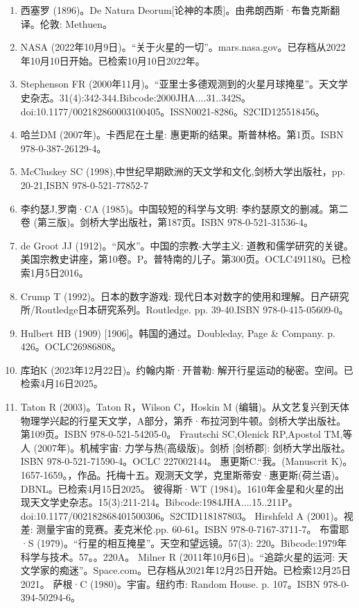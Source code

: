 \begin{enumerate}
\item 西塞罗 (1896)。De Natura Deorum[论神的本质]。由弗朗西斯·布鲁克斯翻译。伦敦: Methuen。
\item NASA (2022年10月9日)。“关于火星的一切”。mars.nasa.gov。已存档从2022年10月10日开始。已检索10月10日2022年。
\item Stephenson FR (2000年11月)。“亚里士多德观测到的火星月球掩星”。天文学史杂志。31(4):342-344.Bibcode:2000JHA....31..342S。doi:10.1177/002182860003100405。ISSN0021-8286。S2CID125518456。  
\item 哈兰DM (2007年)。卡西尼在土星: 惠更斯的结果。斯普林格。第1页。ISBN 978-0-387-26129-4。
\item McCluskey SC (1998),中世纪早期欧洲的天文学和文化,剑桥大学出版社，pp. 20-21,ISBN 978-0-521-77852-7
\item 李约瑟J,罗南·CA (1985)。中国较短的科学与文明: 李约瑟原文的删减。第二卷 (第三版)。剑桥大学出版社，第187页。ISBN 978-0-521-31536-4。
\item de Groot JJ (1912)。“风水”。中国的宗教-大学主义: 道教和儒学研究的关键。美国宗教史讲座，第10卷。P。普特南的儿子。第300页。OCLC491180。已检索1月5日2016。 
\item Crump T (1992)。日本的数字游戏: 现代日本对数字的使用和理解。日产研究所/Routledge日本研究系列。Routledge. pp. 39-40.ISBN 978-0-415-05609-0。
\item Hulbert HB (1909) [1906]。韩国的通过。Doubleday, Page & Company. p. 426。OCLC26986808。 
\item 库珀K (2023年12月22日)。约翰内斯·开普勒: 解开行星运动的秘密。空间。已检索4月16日2025。
\item Taton R (2003)。Taton R，Wilson C，Hoskin M (编辑)。从文艺复兴到天体物理学兴起的行星天文学，A部分，第乔·布拉河到牛顿。剑桥大学出版社。第109页。ISBN 978-0-521-54205-0。
 Frautschi SC,Olenick RP,Apostol TM,等人 (2007年)。机械宇宙: 力学与热(高级版)。剑桥 [剑桥郡]: 剑桥大学出版社。ISBN 978-0-521-71590-4。OCLC 227002144。
 惠更斯C.“我。(Manuscrit K)。1657-1659。，作品。托梅十五。观测天文学，克里斯蒂安·惠更斯(荷兰语)。DBNL。已检索4月15日2025。
 彼得斯·WT (1984)。1610年金星和火星的出现天文学史杂志。15(3):211-214。Bibcode:1984JHA....15..211P。doi:10.1177/002182868401500306。S2CID118187803。 
 Hirshfeld A (2001)。视差: 测量宇宙的竞赛。麦克米伦.pp. 60-61。ISBN 978-0-7167-3711-7。
 布雷耶·S (1979)。“行星的相互掩星”。天空和望远镜。57(3): 220。Bibcode:1979年科学与技术。57。。220A。
 Milner R (2011年10月6日)。“追踪火星的运河: 天文学家的痴迷”。Space.com。已存档从2021年12月25日开始。已检索12月25日2021。
 萨根·C (1980)。宇宙。纽约市: Random House. p. 107。ISBN 978-0-394-50294-6。

\end{enumerate}
